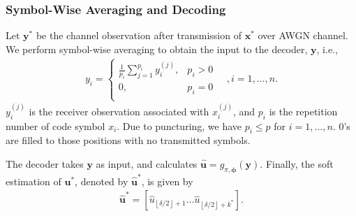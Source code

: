 \documentclass [PhD] {uclathes}
\begin{document}
\subsubsection{Symbol-Wise Averaging and Decoding} Let $\mathbf{y}^*$ be the channel observation after transmission of $\mathbf{x}^*$ over AWGN channel. We perform symbol-wise averaging to obtain the input to the decoder, $\mathbf{y}$, i.e.,
\begin{align}
    y_i=\left\{\begin{matrix}
      \frac{1}{p_i}\sum_{j=1}^{p_i}y^{(j)}_i,&  p_i>0\\ 
      0, &  p_i=0 \\
     \end{matrix}\quad, i=1,\ldots,n. \right.\label{equ: quantization_mag}
\end{align}
$y_i^{(j)}$ is the receiver observation associated with $x^{(j)}_i$, and $p_i$ is the repetition number of code symbol $x_i$. Due to puncturing, we have $p_i\leq p$ for $i=1,\ldots, n$. 0's are filled to those positions with no transmitted symbols.

The decoder takes $\mathbf{y}$ as input, and calculates $\hat{\mathbf{u}}=g_{\pi,{\boldsymbol\phi}}(\mathbf{y})$. Finally, the soft estimation of $\mathbf{u}^*$, denoted by $\hat{\mathbf{u}}^*$, is given by
\begin{align}
    \hat{\mathbf{u}}^*= \left[\hat{u}_{\left\lfloor{\delta}/{2}\right\rfloor+1}\ldots \hat{u}_{\left\lfloor{\delta}/{2}\right\rfloor+k^*}\right].
\end{align} 
\end{document}
